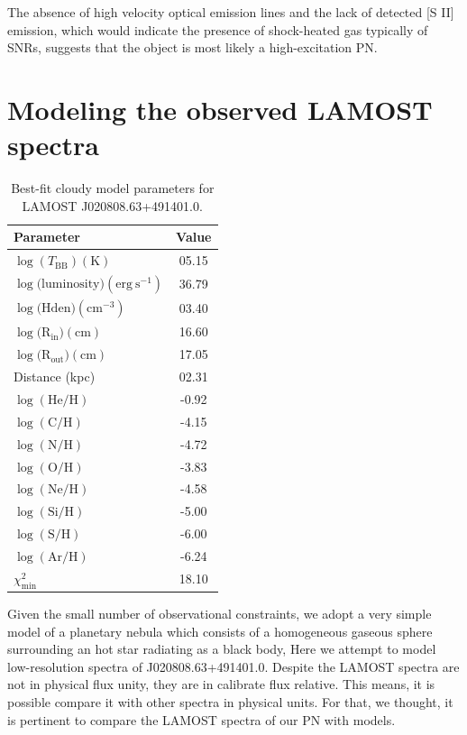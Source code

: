 \documentclass[fleqn,usenatbib]{mnras}
\begin{document}
The absence of high velocity optical emission lines and the lack
of detected [S II] emission, which would indicate the presence of shock-heated gas
typically of SNRs, suggests that the object is most likely a high-excitation PN.


\section{Modeling the observed LAMOST spectra}
\label{sec:model}

\begin{table}
	\centering
	\caption{Best-fit {\sc cloudy} model parameters for LAMOST J020808.63+491401.0.}
	\label{tab:example_table}
	\begin{tabular}{lc} %
                \hline
		\hline
		Parameter & Value \\
                \hline
		$\log(T_{\mathrm{BB}}) (\mathrm{K})$  & 05.15  \\
		$\log(\mathrm{luminosity) (erg~s^{-1})}$ & 36.79 \\
		$\log(\mathrm{Hden) (cm^{-3})} $ & 03.40  \\
                 $\log(\mathrm{R_{in}) (cm)}$ &  16.60\\
                $\log(\mathrm{R_{out}) (cm)}$ & 17.05 \\
                Distance (kpc) & 02.31  \\
                $\log(\mathrm{He/H})$ & -0.92 \\
                $\log(\mathrm{C/H})$ & -4.15 \\
                $\log(\mathrm{N/H})$ & -4.72 \\
                $\log(\mathrm{O/H})$ &  -3.83\\ 
                $\log(\mathrm{Ne/H})$ & -4.58 \\
                $\log(\mathrm{Si/H})$ & -5.00\\ 
                $\log(\mathrm{S/H})$ &  -6.00\\ 
                $\log(\mathrm{Ar/H})$ & -6.24\\
                 \hline
                 $\chi^2_{\text{min}}$ & 18.10  \\
                 
                 \hline
	\end{tabular}
\end{table}

Given the small number of observational constraints, we adopt a very
simple model of a planetary nebula which consists of a homogeneous
gaseous sphere surrounding an hot star radiating as a black body,
Here we attempt to model low-resolution spectra of J020808.63+491401.0.
Despite the LAMOST spectra are not in physical flux unity,
they are in calibrate flux relative. This means, it is possible compare it with other
spectra in physical units. For that, we thought, it is pertinent to
compare the LAMOST spectra of our PN with models.
\end{document}
